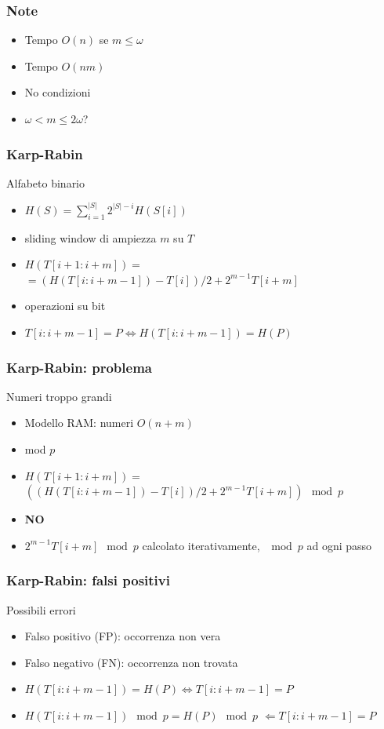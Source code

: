 \begin{frame}[fragile]
\frametitle{Note}
\begin{itemize}
\item
Tempo $O(n)$ se $m\le \omega$
\item
Tempo $O(nm)$
\item
No condizioni
\item
$\omega < m\le 2\omega$?
\end{itemize}
\end{frame}

\begin{frame}[fragile]
\frametitle{Karp-Rabin}
\begin{block}{Alfabeto binario}
\begin{itemize}
\item
$H(S)=\sum_{i=1}^{|S|} 2^{|S| - i}H(S[i])$
\item
sliding window di ampiezza $m$ su $T$
\item
$H(T[i+1:i+m]) =$\\
$=\left(H(T[i:i+m-1]) - T[i] \right) / 2 + 2^{m-1}T[i+m]$
\item
operazioni su bit
\item
$T[i:i+m-1]=P \Leftrightarrow H(T[i:i+m-1])=H(P)$
\end{itemize}
\end{block}
\end{frame}

\begin{frame}[fragile]
\frametitle{Karp-Rabin: problema}
\begin{block}{Numeri troppo grandi}
\begin{itemize}
\item
Modello RAM: numeri $O(n+m)$
\item
mod $p$
\item
$H(T[i+1:i+m]) =$\\
$\left(\left(H(T[i:i+m-1]) - T[i] \right) / 2 + 2^{m-1}T[i+m] \right)\mod p$
\item \textbf{NO}
\item
$2^{m-1}T[i+m] \mod p$ calcolato iterativamente, $\mod p$ ad ogni passo
\end{itemize}
\end{block}
\end{frame}

\begin{frame}[fragile]
\frametitle{Karp-Rabin: falsi positivi}
\begin{block}{Possibili errori}
\begin{itemize}
\item
Falso positivo (FP): occorrenza non vera
\item
Falso negativo (FN): occorrenza non trovata
\item
$H(T[i:i+m-1])=H(P) \Leftrightarrow T[i:i+m-1]=P$
\item
$H(T[i:i+m-1])  \mod p = H(P)  \mod p$
$\Leftarrow T[i:i+m-1]=P$
\end{itemize}
\end{block}
\end{frame}


